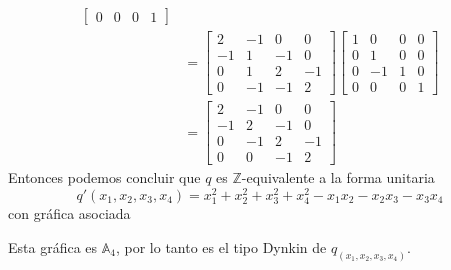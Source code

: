 \begin{example}
\begin{equation*}
\begin{split}
\begin{bmatrix}
                0 &  0  & 0 & 1
            \end{bmatrix}\\
 & = \begin{bmatrix}
                2 & -1  &  0 &   0\\
               -1 &  1  & -1 &   0\\
                0 &  1  &  2 &  -1 \\
                0 & -1  & -1 &   2
           \end{bmatrix}
           \begin{bmatrix}
                1 &  0  & 0 & 0\\
                0 &  1  & 0 & 0\\
                0 & -1  & 1 & 0 \\
                0 &  0  & 0 & 1
            \end{bmatrix}\\
 & = \begin{bmatrix}
                2 & -1  &   0   &   0\\
               -1 &  2  &  -1  &   0\\
                0 & -1  &   2  &  -1 \\
                0 &  0  &  -1  &   2
           \end{bmatrix}
\end{split}
\end{equation*}
Entonces podemos concluir que $q$ es $\mathbb{Z}$-equivalente a la forma unitaria
\begin{equation*}
q'\left(x_{1}, x_{2}, x_{3}, x_{4}\right) = x^{2}_{1} + x^{2}_{2} + x^{2}_{3} + x^{2}_{4} - x_{1}x_{2} - x_{2}x_{3} - x_{3}x_{4}
\end{equation*}
con gráfica asociada
\begin{center}
\end{center}
Esta gráfica es $\mathbb{A}_{4}$, por lo tanto es el tipo Dynkin de $q_{(x_{1}, x_{2}, x_{3}, x_{4})}$.
\end{example}
